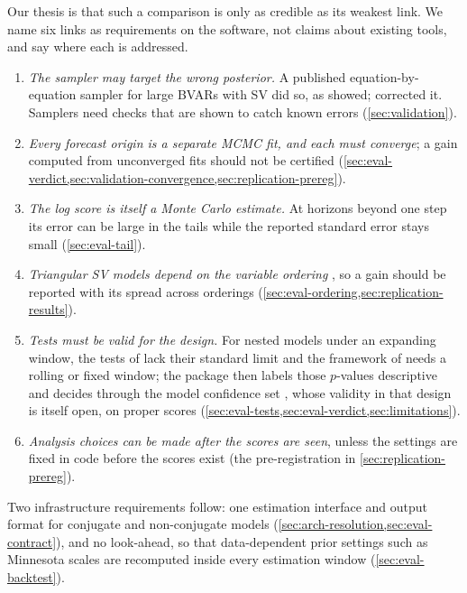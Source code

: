 Our thesis is that such a comparison is only as credible as its weakest link.
We name six links as requirements on the software, not claims about existing tools, and say where each is addressed.
\begin{enumerate}
\item \emph{The sampler may target the wrong posterior.}
  A published equation-by-equation sampler for large BVARs with SV \citep{carriero2019large} did so, as \citet{bognanni2022comment} showed; \citet{carriero2022corrigendum} corrected it.
  Samplers need checks that are shown to catch known errors (\cref{sec:validation}).
\item \emph{Every forecast origin is a separate MCMC fit, and each must converge}; a gain computed from unconverged fits should not be certified (\cref{sec:eval-verdict,sec:validation-convergence,sec:replication-prereg}).
\item \emph{The log score is itself a Monte Carlo estimate.}
  At horizons beyond one step its error can be large in the tails while the reported standard error stays small (\cref{sec:eval-tail}). %
\item \emph{Triangular SV models depend on the variable ordering} \citep{arias2023macroeconomic,chan2024large}, so a gain should be reported with its spread across orderings (\cref{sec:eval-ordering,sec:replication-results}).
\item \emph{Tests must be valid for the design.}
  For nested models under an expanding window, the tests of \citet{diebold1995comparing} lack their standard limit \citep{clark2001tests} and the framework of \citet{giacomini2006tests} needs a rolling or fixed window; the package then labels those $p$-values descriptive and decides through the model confidence set \citep{hansen2011model}, whose validity in that design is itself open, on proper scores \citep{gneiting2007strictly} (\cref{sec:eval-tests,sec:eval-verdict,sec:limitations}).
\item \emph{Analysis choices can be made after the scores are seen}, unless the settings are fixed in code before the scores exist (the pre-registration in \cref{sec:replication-prereg}).
\end{enumerate}
Two infrastructure requirements follow: one estimation interface and output format for conjugate and non-conjugate models (\cref{sec:arch-resolution,sec:eval-contract}), and no look-ahead, so that data-dependent prior settings such as Minnesota scales are recomputed inside every estimation window (\cref{sec:eval-backtest}). %

